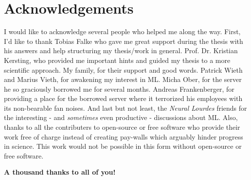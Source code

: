 \documentclass[report,type=bsc,colorback,accentcolor=tud9c,bigchapter,bibliography=totoc,11pt]{tudthesis}
\begin{document}
  \section*{Acknowledgements}
  I would like to acknowledge several people who helped me along the way.
  First, I'd like to thank Tobias Falke who gave me great support during the thesis with his answers and help structuring my thesis/work in general.
  Prof. Dr. Kristian Kersting, who provided me important hints and guided my thesis to a more scientific approach.
  My family, for their support and good words.
  Patrick Wieth and Marius Vieth, for awakening my interest in ML.
  Micha Ober, for the server he so graciously borrowed me for several months.
  Andreas Frankenberger, for providing a place for the borrowed server where it terrorized his employees with its non-bearable fan noises.
  And last but not least, the \textit{Neural Lourdes} friends for the interesting - and \textit{sometimes} even productive - discussions about ML.
  Also, thanks to all the contributers to open-source or free software who provide their work free of charge instead of creating pay-walls which arguably hinder progress in science.
  This work would not be possible in this form without open-source or free software.
  
  \vspace{0.5cm}
  \centering\textsf{\textbf{A thousand thanks to all of you!}}
\end{document}
